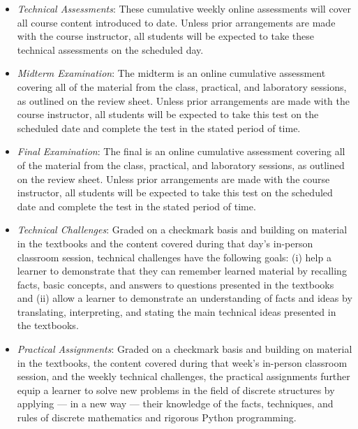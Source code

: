 \documentclass[11pt]{article}
\begin{document}
\begin{itemize}

  \item {\em Technical Assessments\/}: These cumulative weekly online
    assessments will cover all course content introduced to date. Unless prior
    arrangements are made with the course instructor, all students will be
    expected to take these technical assessments on the scheduled day.

  \item {\em Midterm Examination\/}: The midterm is an online cumulative
    assessment covering all of the material from the class, practical, and
    laboratory sessions, as outlined on the review sheet. Unless prior
    arrangements are made with the course instructor, all students will be
    expected to take this test on the scheduled date and complete the test in
    the stated period of time.

  \item {\em Final Examination\/}: The final is an online cumulative assessment
    covering all of the material from the class, practical, and laboratory
    sessions, as outlined on the review sheet. Unless prior arrangements are
    made with the course instructor, all students will be expected to take this
    test on the scheduled date and complete the test in the stated period of
    time.

  \item {\em Technical Challenges\/}: Graded on a checkmark basis and building
    on material in the textbooks and the content covered during that day's
    in-person classroom session, technical challenges have the following goals:
    (i) help a learner to demonstrate that they can remember learned material
    by recalling facts, basic concepts, and answers to questions presented in
    the textbooks and (ii) allow a learner to demonstrate an understanding of
    facts and ideas by translating, interpreting, and stating the main
    technical ideas presented in the textbooks.

  \item {\em Practical Assignments\/}: Graded on a checkmark basis and building
    on material in the textbooks, the content covered during that week's
    in-person classroom session, and the weekly technical challenges, the
    practical assignments further equip a learner to solve new problems in the
    field of discrete structures by applying --- in a new way --- their
    knowledge of the facts, techniques, and rules of discrete mathematics and
    rigorous Python programming.


\end{itemize}
\end{document}
